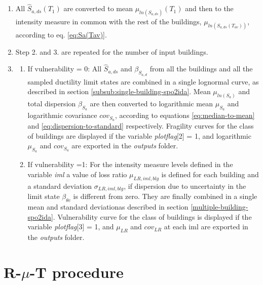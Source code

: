 \begin{enumerate}
\begin{itemize}
\end{itemize}

\item All $\hat{S}_{a, ds}(T_1)$ are converted to mean $\mu_{ln(S_{a, ds})}(T_1)$ and then to the intensity measure in common with the rest of the buildings, $\mu_{ln(S_{a, ds}(T_{av}))}$, according to eq. \ref{eq:Sa(Tav)}.

\item Step 2. and 3. are repeated for the number of input buildings.

\item
\begin{enumerate}

\item If vulnerability = 0: All $\hat{S}_{a,ds}$ and $\beta_{S_{a, d}}$ from all the buildings and all the sampled ductility limit states are combined in a single lognormal curve, as described in section \ref{subsub:single-building-spo2ida}. 
Mean $\mu_{ln(S_{a})}$ and total dispersion $\beta_{S_a}$ are then converted to logarithmic mean $\mu_{S_a}$ and logarithmic covariance $cov_{S_a}$, according to equations \ref{eq:median-to-mean} and \ref{eq:dispersion-to-standard} respectively.
Fragility curves for the class of buildings are displayed if the variable \textit{plotflag}[2] = 1, and logarithmic $\mu_{S_a}$ and $cov_{S_a}$ are exported in the \textit{outputs} folder.
\item If vulnerability =1:  
For the intensity measure levels defined in the variable \textit{iml} a value of loss ratio $\mu_{LR, iml, blg}$ is defined for each building and a standard deviation $\sigma_{LR, iml, blg}$, if dispersion due to uncertainty in the limit state $\beta_{\theta c}$ is different from zero. They are finally combined in a single mean and standard deviationas described in section \ref{multiple-building-spo2ida}. Vulnerability curve for the class of buildings is displayed if the variable \textit{plotflag}[3] = 1, and $\mu_{LR}$ and $cov_{LR}$ at each iml are exported in the \textit{outputs} folder.
\end{enumerate}

\end{enumerate}

\section{R-$\mu$-T procedure}
\label{sec:DF}
